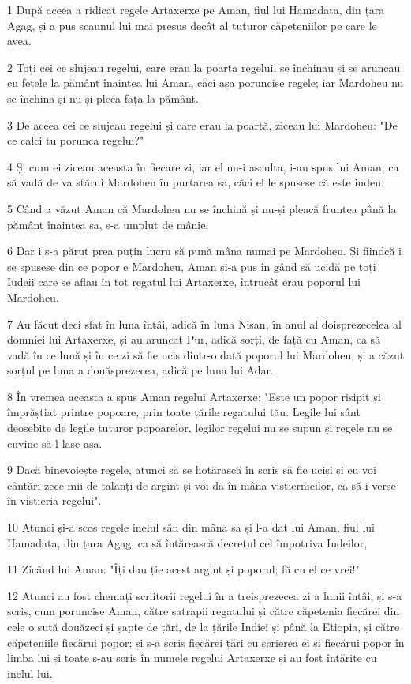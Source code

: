\par 1 După aceea a ridicat regele Artaxerxe pe Aman, fiul lui Hamadata, din țara Agag, și a pus scaunul lui mai presus decât al tuturor căpeteniilor pe care le avea.
\par 2 Toți cei ce slujeau regelui, care erau la poarta regelui, se închinau și se aruncau cu fețele la pământ înaintea lui Aman, căci așa poruncise regele; iar Mardoheu nu se închina și nu-și pleca fața la pământ.
\par 3 De aceea cei ce slujeau regelui și care erau la poartă, ziceau lui Mardoheu: "De ce calci tu porunca regelui?"
\par 4 Și cum ei ziceau aceasta în fiecare zi, iar el nu-i asculta, i-au spus lui Aman, ca să vadă de va stărui Mardoheu în purtarea sa, căci el le spusese că este iudeu.
\par 5 Când a văzut Aman că Mardoheu nu se închină și nu-și pleacă fruntea până la pământ înaintea sa, s-a umplut de mânie.
\par 6 Dar i s-a părut prea puțin lucru să pună mâna numai pe Mardoheu. Și fiindcă i se spusese din ce popor e Mardoheu, Aman și-a pus în gând să ucidă pe toți Iudeii care se aflau în tot regatul lui Artaxerxe, întrucât erau poporul lui Mardoheu.
\par 7 Au făcut deci sfat în luna întâi, adică în luna Nisan, în anul al doisprezecelea al domniei lui Artaxerxe, și au aruncat Pur, adică sorți, de față cu Aman, ca să vadă în ce lună și în ce zi să fie ucis dintr-o dată poporul lui Mardoheu, și a căzut sorțul pe luna a douăsprezecea, adică pe luna lui Adar.
\par 8 În vremea aceasta a spus Aman regelui Artaxerxe: "Este un popor risipit și împrăștiat printre popoare, prin toate țările regatului tău. Legile lui sânt deosebite de legile tuturor popoarelor, legilor regelui nu se supun și regele nu se cuvine să-l lase așa.
\par 9 Dacă binevoiește regele, atunci să se hotărască în scris să fie uciși și eu voi cântări zece mii de talanți de argint și voi da în mâna vistiernicilor, ca să-i verse în vistieria regelui".
\par 10 Atunci și-a scos regele inelul său din mâna sa și l-a dat lui Aman, fiul lui Hamadata, din țara Agag, ca să întărească decretul cel împotriva Iudeilor,
\par 11 Zicând lui Aman: "Îți dau ție acest argint și poporul; fă cu el ce vrei!"
\par 12 Atunci au fost chemați scriitorii regelui în a treisprezecea zi a lunii întâi, și s-a scris, cum poruncise Aman, către satrapii regatului și către căpetenia fiecărei din cele o sută douăzeci și șapte de țări, de la țările Indiei și până la Etiopia, și către căpeteniile fiecărui popor; și s-a scris fiecărei țări cu scrierea ei și fiecărui popor în limba lui și toate s-au scris în numele regelui Artaxerxe și au fost întărite cu inelul lui.
